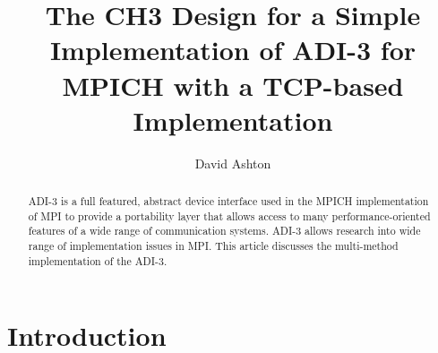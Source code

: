 \documentclass[dvipdfm,twoside,11pt]{article}
\begin{document}
%
\title{The CH3 Design for a Simple Implementation of ADI-3 for MPICH with a
TCP-based Implementation}
\author{David Ashton}
\maketitle

{}
\setcounter{page}{0}
\cleardoublepage
\pagestyle{plain}
\begingroup
\parskip=0pt
\tableofcontents
\bigskip
\endgroup
\bigskip

\clearpage

\setcounter{page}{1}

\begin{abstract}
ADI-3 is a full featured, abstract device interface used in the MPICH
implementation of MPI to provide a portability layer that allows
access to many performance-oriented features of a wide range of
communication systems.  ADI-3 allows research into wide range of
implementation issues in MPI.  This article discusses the multi-method
implementation of the ADI-3.
\end{abstract}

\section{Introduction}
\end{document}
